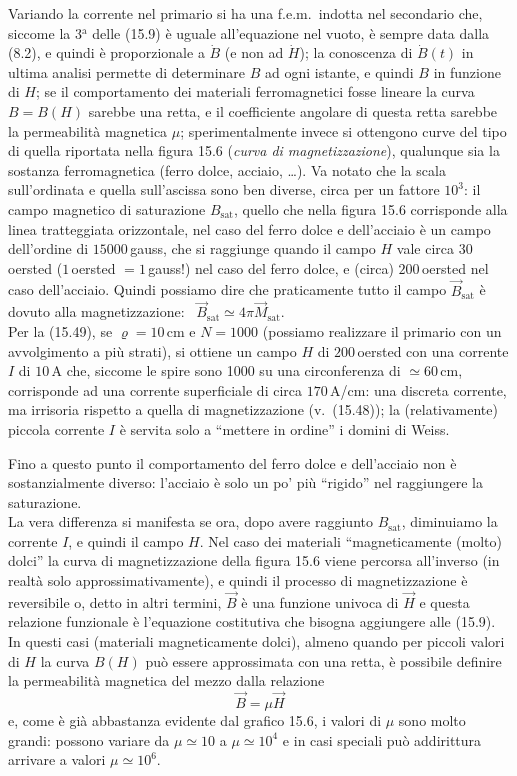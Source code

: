 Variando la corrente nel primario si ha una f.e.m.\ indotta nel secondario che,
siccome la 3$^\mathrm{a}$ delle (15.9) \`e uguale all'equazione nel vuoto, \`e
sempre data dalla (8.2), e quindi \`e proporzionale a $\dot B$ (e non ad
$\dot H$); la conoscenza di $\dot B(t)$ in ultima analisi permette di
determinare $B$ ad ogni istante, e quindi $B$ in funzione di $H$; se il
comportamento dei materiali ferromagnetici fosse lineare la curva $B=B(H)$
sarebbe una retta, e il coefficiente angolare di questa retta sarebbe la
permeabilit\`a magnetica $\mu$; sperimentalmente invece si ottengono curve del
tipo di quella riportata nella figura 15.6 (\textit{curva di magnetizzazione}),
qualunque sia la sostanza ferromagnetica (ferro dolce, acciaio, \dots).
Va notato che la scala sull'ordinata e quella sull'ascissa sono ben diverse,
circa per un fattore $10^3$: il campo magnetico di saturazione
$B_{\mathrm{sat}}$, quello che nella figura 15.6 corrisponde alla linea
tratteggiata orizzontale, nel caso del ferro dolce e dell'acciaio \`e un campo
dell'ordine di $15000\,$gauss, che si raggiunge quando il campo $H$ vale circa
$30\,$oersted ($1\,$oersted $=1\,$gauss!) nel caso del ferro dolce, e (circa)
$200\,$oersted nel caso dell'acciaio. Quindi possiamo dire che praticamente
tutto il campo $\vec B_{\mathrm{sat}}$ \`e dovuto alla magnetizzazione:
\ $\vec B_{\mathrm{sat}}\simeq4\pi\vec M_{\mathrm{sat}}$.\\
Per la (15.49), se $\varrho=10\,$cm e $N=1000$ (possiamo realizzare il primario
con un avvolgimento a pi\`u strati), si ottiene un campo $H$ di $200\,$oersted
con una corrente $I$ di $10\,$A che, siccome le spire sono 1000 su una
circonferenza di $\simeq60\,$cm, corrisponde ad una corrente superficiale di
circa $170\,$A/cm: una discreta corrente, ma irrisoria rispetto a quella di
magnetizzazione \big(v.\ (15.48)\big); la (relativamente) piccola corrente $I$
\`e servita solo a ``mettere in ordine'' i domini di Weiss.

Fino a questo punto il comportamento del ferro dolce e dell'acciaio non \`e
sostanzialmente diverso: l'acciaio \`e solo un po' pi\`u ``rigido'' nel
raggiungere la saturazione.\\
La vera differenza si manifesta se ora, dopo avere raggiunto $B_{\mathrm{sat}}$,
diminuiamo la corrente $I$, e quindi il campo $H$. Nel caso dei materiali
``magneticamente (molto) dolci'' la curva di magnetizzazione della figura 15.6
viene percorsa all'inverso (in realt\`a solo approssimativamente), e quindi il
processo di magnetizzazione \`e reversibile o, detto in altri termini, $\vec B$
\`e una funzione univoca di $\vec H$ e questa relazione funzionale \`e
l'equazione costitutiva che bisogna aggiungere alle (15.9). In questi casi
(materiali magneticamente dolci), almeno quando per piccoli valori di $H$ la
curva $B(H)$ pu\`o essere approssimata con una retta, \`e possibile definire la
permeabilit\`a magnetica del mezzo dalla relazione
\begin{equation}
  \vec B=\mu\vec H
  \tag{15.50}
\end{equation}
e, come \`e gi\`a abbastanza evidente dal grafico 15.6, i valori di $\mu$ sono
molto grandi: possono variare da $\mu\simeq10$ a $\mu\simeq10^4$ e in casi
speciali pu\`o addirittura arrivare a valori $\mu\simeq10^6$.

